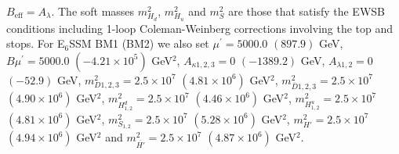 \documentclass[preprint,amsmath,amssymb,aps,superscriptaddress,prd,showpacs,floatfix,nofootinbib]{revtex4-1}
\begin{document}
\begin{table}[h]
{$B_{\mathrm{eff}}=A_\lambda$. The soft masses $m_{H_d}^2$, $m_{H_u}^2$ and $m_S^2$ are those that satisfy the EWSB conditions including 1-loop Coleman-Weinberg corrections involving the top and stops. For E$_6$SSM BM1 (BM2) we also set $\mu^\prime = 5000.0$ $(897.9)$ GeV, $B\mu^\prime = 5000.0$ $(-4.21\times 10^5)$ GeV$^2$, $A_{\kappa 1,2,3} = 0$ $(-1389.2)$ GeV, $A_{\lambda 1,2} = 0$ $(-52.9)$ GeV, $m_{D1,2,3}^2 = 2.5\times 10^7$ $(4.81\times 10^6)$ GeV$^2$, $m_{\overline{D}1,2,3}^2 = 2.5\times 10^7$ $(4.90\times 10^6)$ GeV$^2$, $m_{H^d_{1,2}}^2 = 2.5\times 10^7$ $(4.46\times 10^6)$ GeV$^2$, $m_{H^u_{1,2}}^2 = 2.5\times 10^7$ $(4.81\times 10^6)$ GeV$^2$, $m_{S_{1,2}}^2 = 2.5\times 10^7$ $(5.28\times 10^6)$ GeV$^2$, $m_{H'}^2 = 2.5\times 10^7$ $(4.94\times 10^6)$ GeV$^2$ and $m_{\overline{H'}}^2 = 2.5\times 10^7$ $(4.87\times 10^6)$ GeV$^2$.
}
\label{tab:benchmarks}
\end{table}
\endgroup
\end{document}

